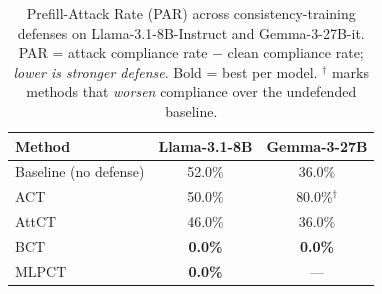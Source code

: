 \begin{table}[h]
\centering
\caption{Prefill-Attack Rate (PAR) across consistency-training defenses
on Llama-3.1-8B-Instruct and Gemma-3-27B-it. PAR = attack compliance rate
$-$ clean compliance rate; \emph{lower is stronger defense}.
Bold = best per model.
$^{\dagger}$ marks methods that \emph{worsen} compliance over the undefended baseline.}
\label{tab:prefill-par-results}
\setlength{\tabcolsep}{10pt}
\begin{tabular}{lcc}
\toprule
\textbf{Method} & \textbf{Llama-3.1-8B} & \textbf{Gemma-3-27B} \\
\midrule
Baseline (no defense) & 52.0\%         & 36.0\%         \\
\addlinespace[2pt]
ACT                   & 50.0\%         & 80.0\%$^{\dagger}$ \\
AttCT                 & 46.0\%         & 36.0\%         \\
BCT                   & \textbf{0.0\%} & \textbf{0.0\%} \\
MLPCT                 & \textbf{0.0\%} & ---            \\
\bottomrule
\end{tabular}
\end{table}
